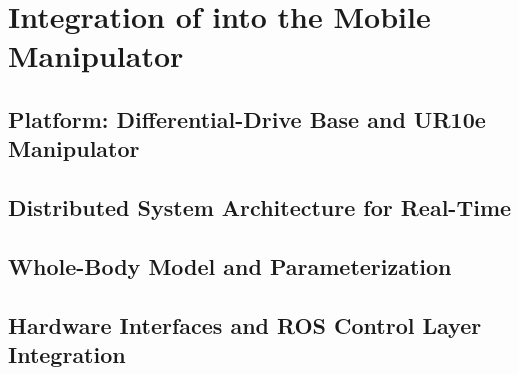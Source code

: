 \chapter{Integration of \ocs{} into the \hero{} Mobile Manipulator}
\label{ch:integration}

\section{\hero{} Platform: Differential-Drive Base and UR10e Manipulator}
\label{sec:hero-platform}


\section{Distributed System Architecture for Real-Time \mpc{}}
\label{sec:distributed-arch}


\section{Whole-Body Model and Parameterization}
\label{sec:wholebody-model}


\section{Hardware Interfaces and ROS Control Layer Integration}
\label{sec:hw-interfaces}

